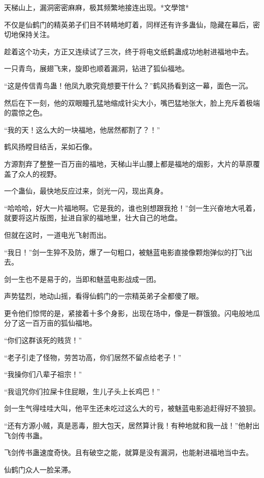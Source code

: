 
\begin{this_body}

天梯山上，漏洞密密麻麻，极其频繁地接连出现。*文學馆*

不仅是仙鹤门的精英弟子们目不转睛地盯着，同样还有许多蛊仙，隐藏在幕后，密切地保持关注。

趁着这个功夫，方正又连续试了三次，终于将电文纸鹤蛊成功地射进福地中去。

一只青鸟，展翅飞来，旋即也顺着漏洞，钻进了狐仙福地。

“这是传信青鸟蛊！他凤九歌究竟想要干什么？”鹤风扬看到这一幕，面色一沉。

然后在下一刻，他的双眼瞳孔猛地缩成针尖大小，嘴巴猛地张大，脸上充斥着极端的震惊之色。

“我的天！这么大的一块福地，他居然都割了？！”

鹤风扬瞠目结舌，呆如石像。

方源割弃了整整一百万亩的福地，天梯山半山腰上都是福地的烟影，大片的草原覆盖了众人的视野。

一个蛊仙，最快地反应过来，剑光一闪，现出真身。

“哈哈哈，好大一片福地啊。它是我的，谁也别想跟我抢！”剑一生兴奋地大吼着，就要将这片版图，扯进自家的福地里，壮大自己的地盘。

但就在这时，一道电光飞射而出。

“我日！”剑一生猝不及防，爆了一句粗口，被魅蓝电影直接像颗炮弹似的打飞出去。

剑一生也不是易于的，当即和魅蓝电影战成一团。

声势猛烈，地动山摇，看得仙鹤门的一宗精英弟子全都傻了眼。

更令他们惊愕的是，紧接着十多个身影，出现在场中，像是一群饿狼。闪电般地瓜分了这一百万亩的狐仙福地。

“你们这群该死的贱货！”

“老子引走了怪物，劳苦功高，你们居然不留点给老子！”

“我操你们八辈子祖宗！”

“我诅咒你们拉屎卡住屁眼，生儿子头上长鸡巴！”

剑一生气得哇哇大叫，他平生还未吃过这么大的亏，被魅蓝电影追赶得好不狼狈。

“还有方源小贼，真是恶毒，胆大包天，居然算计我！有种地就和我一战！”他射出飞剑传书蛊。

飞剑传书蛊速度奇快。且有破空之能，就算是没有漏洞，也能射进福地当中去。

仙鹤门众人一脸呆滞。


\end{this_body}
